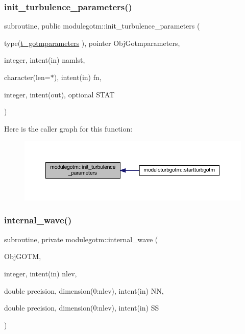 \mbox{\label{namespacemodulegotm_a88820406e3c80bbfc120dbf96b66424b}} 
\subsubsection{\texorpdfstring{init\+\_\+turbulence\+\_\+parameters()}{init\_turbulence\_parameters()}}
{\footnotesize\ttfamily subroutine, public modulegotm\+::init\+\_\+turbulence\+\_\+parameters (\begin{DoxyParamCaption}\item[{type(\mbox{\hyperlink{structmodulegotm_1_1t__gotmparameters}{t\+\_\+gotmparameters}} ), pointer}]{Obj\+Gotmparameters,  }\item[{integer, intent(in)}]{namlst,  }\item[{character(len=$\ast$), intent(in)}]{fn,  }\item[{integer, intent(out), optional}]{S\+T\+AT }\end{DoxyParamCaption})}

Here is the caller graph for this function\+:\nopagebreak
\begin{figure}[H]
\begin{center}
\leavevmode
\includegraphics[width=350pt]{namespacemodulegotm_a88820406e3c80bbfc120dbf96b66424b_icgraph}
\end{center}
\end{figure}
\mbox{\label{namespacemodulegotm_a4287a5fde4824d73e35ee66bf90b5f3b}} 
\subsubsection{\texorpdfstring{internal\+\_\+wave()}{internal\_wave()}}
{\footnotesize\ttfamily subroutine, private modulegotm\+::internal\+\_\+wave (\begin{DoxyParamCaption}\item[{}]{Obj\+G\+O\+TM,  }\item[{integer, intent(in)}]{nlev,  }\item[{double precision, dimension(0\+:nlev), intent(in)}]{NN,  }\item[{double precision, dimension(0\+:nlev), intent(in)}]{SS }\end{DoxyParamCaption})\hspace{0.3cm}{\ttfamily [private]}}

